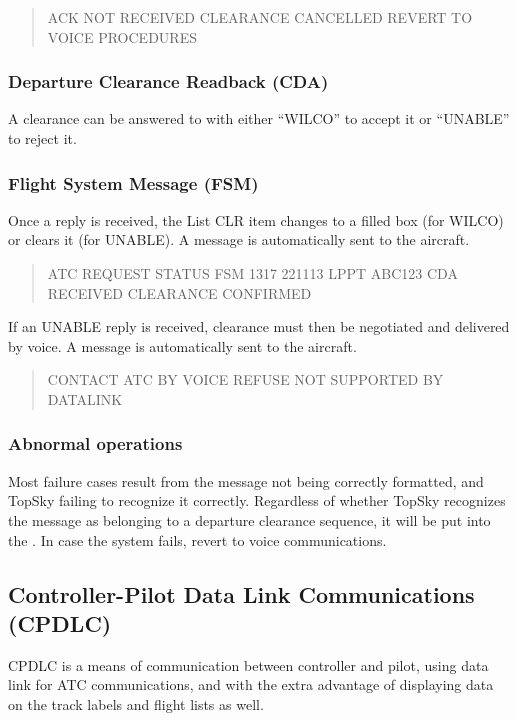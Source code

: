 \documentclass[a4paper,oneside,11pt]{memoir}
\newcommand{\winref}[1]{\textit{\titleref{#1}}}
\begin{document}
\begin{quote}
  ACK NOT RECEIVED CLEARANCE CANCELLED REVERT TO VOICE PROCEDURES
\end{quote}

\subsubsection{Departure Clearance Readback (CDA)}

A clearance can be answered to with either “WILCO” to accept it or “UNABLE” to reject it.

\subsubsection{Flight System Message (FSM)}

Once a reply is received, the List CLR item changes to a filled box (for WILCO) or clears it (for UNABLE). A message is automatically sent to the aircraft.

\begin{quote}
  ATC REQUEST STATUS FSM 1317 221113 LPPT ABC123 CDA RECEIVED CLEARANCE CONFIRMED 
\end{quote}

If an UNABLE reply is received, clearance must then be negotiated and delivered by voice. A message is automatically sent to the aircraft.

\begin{quote}
  CONTACT ATC BY VOICE REFUSE NOT SUPPORTED BY DATALINK
\end{quote}

\subsubsection{Abnormal operations}

Most failure cases result from the message not being correctly formatted, and TopSky failing to recognize it correctly. Regardless of whether TopSky recognizes the message as belonging to a departure clearance sequence, it will be put into the \winref{win:dlcmw}. In case the system fails, revert to voice communications.

\subsection{Controller-Pilot Data Link Communications (CPDLC)}
\label{cpdlc}

CPDLC is a means of communication between controller and pilot, using data link for ATC communications, and with the extra advantage of displaying data on the track labels and flight lists as well.
\end{document}
